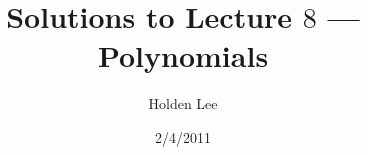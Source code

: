 
\pagestyle{fancy}





%
%

\title{Solutions to Lecture $8$ --- Polynomials}%
\author{Holden Lee}
\date{2/4/2011}%
\maketitle
\thispagestyle{empty}
